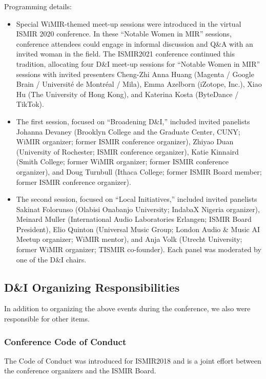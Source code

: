 \documentclass[%
10pt,								%
titlepage,						%
]
{scrartcl}
\begin{document}
                Programming details:
                \begin{itemize}
                    \item   Special WiMIR-themed meet-up sessions were introduced in the virtual ISMIR 2020 conference. In these ``Notable Women in MIR'' sessions, conference attendees could engage in informal discussion and Q\&A with an invited woman in the field. The ISMIR2021 conference continued this tradition, allocating four D\&I meet-up sessions for ``Notable Women in MIR'' sessions with invited presenters Cheng-Zhi Anna Huang (Magenta / Google Brain / Universit\'e de Montr\'eal / Mila), Emma Azelborn (iZotope, Inc.), Xiao Hu (The University of Hong Kong), and Katerina Kosta (ByteDance / TikTok).
                    \item   The first session, focused on ``Broadening D\&I,'' included invited panelists Johanna Devaney (Brooklyn College and the Graduate Center, CUNY; WiMIR organizer; former ISMIR conference organizer), Zhiyao Duan (University of Rochester; ISMIR conference organizer), Katie Kinnaird (Smith College; former WiMIR organizer; former ISMIR conference organizer), and Doug Turnbull (Ithaca College; former ISMIR Board member; former ISMIR conference organizer). 
                    \item   The second session, focused on ``Local Initiatives,'' included invited panelists Sakinat Folorunso (Olabisi Onabanjo University; IndabaX Nigeria organizer), Meinard Muller (International Audio Laboratories Erlangen; ISMIR Board President), Elio Quinton (Universal Music Group; London Audio \& Music AI Meetup organizer; WiMIR mentor), and Anja Volk (Utrecht University; former WiMIR organizer; TISMIR co-founder). Each panel was moderated by one of the D\&I chairs.

                \end{itemize}


    \subsection{D\&I Organizing Responsibilities}
        In addition to organizing the above events during the conference, we also were responsible for other items.
        
        \subsubsection{Conference Code of Conduct}
            The Code of Conduct was introduced for ISMIR2018 and is a joint effort between the conference organizers and the ISMIR Board.
            
\end{document}
